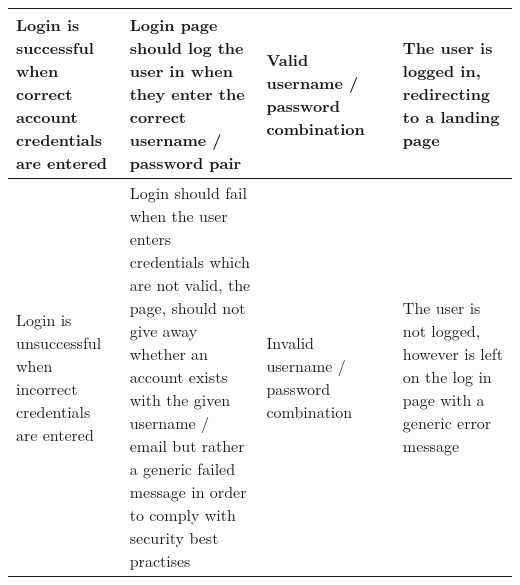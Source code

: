 \documentclass[11pt]{report}
\begin{document}
\begin{center}
\begin{longtable}{| p{2.5cm} | p{6cm} | p{2cm} | p{2cm} | p{2.5cm} | }
\hline
Login is successful when correct account credentials are entered&Login page should log the user in when they enter the correct username / password pair&Valid username / password combination&&The user is logged in, redirecting to a landing page\\
\hline
Login is unsuccessful when incorrect credentials are entered&Login should fail when the user enters credentials which are not valid, the page, should not give away whether an account exists with the given username / email but rather a generic failed message in order to comply with security best practises&Invalid username / password combination&&The user is not logged, however is left on the log in page with a generic error message\\
\hline

\end{longtable}

\end{center}

{}

\end{document}
